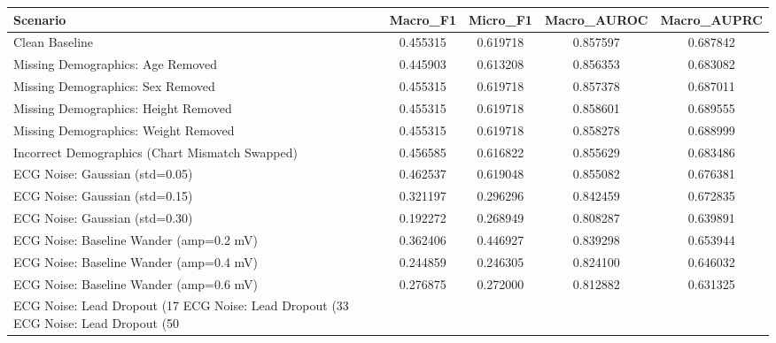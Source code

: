 \begin{tabular}{lcccc}
\toprule
Scenario & Macro_F1 & Micro_F1 & Macro_AUROC & Macro_AUPRC \\
\midrule
Clean Baseline & 0.455315 & 0.619718 & 0.857597 & 0.687842 \\
Missing Demographics: Age Removed & 0.445903 & 0.613208 & 0.856353 & 0.683082 \\
Missing Demographics: Sex Removed & 0.455315 & 0.619718 & 0.857378 & 0.687011 \\
Missing Demographics: Height Removed & 0.455315 & 0.619718 & 0.858601 & 0.689555 \\
Missing Demographics: Weight Removed & 0.455315 & 0.619718 & 0.858278 & 0.688999 \\
Incorrect Demographics (Chart Mismatch Swapped) & 0.456585 & 0.616822 & 0.855629 & 0.683486 \\
ECG Noise: Gaussian (std=0.05) & 0.462537 & 0.619048 & 0.855082 & 0.676381 \\
ECG Noise: Gaussian (std=0.15) & 0.321197 & 0.296296 & 0.842459 & 0.672835 \\
ECG Noise: Gaussian (std=0.30) & 0.192272 & 0.268949 & 0.808287 & 0.639891 \\
ECG Noise: Baseline Wander (amp=0.2 mV) & 0.362406 & 0.446927 & 0.839298 & 0.653944 \\
ECG Noise: Baseline Wander (amp=0.4 mV) & 0.244859 & 0.246305 & 0.824100 & 0.646032 \\
ECG Noise: Baseline Wander (amp=0.6 mV) & 0.276875 & 0.272000 & 0.812882 & 0.631325 \\
ECG Noise: Lead Dropout (17%
ECG Noise: Lead Dropout (33%
ECG Noise: Lead Dropout (50%
\bottomrule
\end{tabular}
